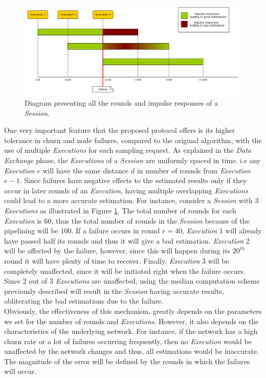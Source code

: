 \documentclass[a4paper,11pt,twoside]{report}
\begin{document}
\begin{figure}[h]
\centering
\includegraphics[width=1\textwidth]{../figures/fault_tolerance.png}
\caption{Diagram presenting all the rounds and impulse responses of a \textit{Session}.}
\label{fig:fault_tolerance}
\end{figure}
One very important feature that the proposed protocol offers is its higher tolerance in churn and node failures, compared to the original algorithm, with the use of multiple \textit{Executions} for each sampling request. As explained in the \textit{Data Exchange} phase, the \textit{Executions} of a \textit{Session} are uniformly spaced in time. i.e any \textit{Execution} $e$ will have the same distance $d$ in number of rounds from \textit{Execution} $e-1$. Since failures have negative effects to the estimated results only if they occur in later rounds of an \textit{Execution}, having multiple overlapping \textit{Executions} could lead to a more accurate estimation. For instance, consider a \textit{Session} with 3 \textit{Executions} as illustrated in Figure \ref{fig:fault_tolerance}. The total number of rounds for each \textit{Execution} is 60, thus the total number of rounds in the \textit{Session} because of the pipelining will be 100. If a failure occurs in round $r=40$, \textit{Execution} 1 will already have passed half its rounds and thus it will give a bad estimation. \textit{Execution} 2 will be affected by the failure, however, since this will happen during its $20^{th}$ round it will have plenty of time to recover. Finally, \textit{Execution} 3 will be completely unaffected, since it will be initiated right when the failure occurs. Since 2 out of 3 \textit{Executions} are unaffected, using the median computation scheme previously described will result in the \textit{Session} having accurate results, obliterating the bad estimations due to the failure. \\


Obviously, the effectiveness of this mechanism, greatly depends on the parameters we set for the number of rounds and \textit{Executions}. However, it also depends on the characteristics of the underlying network. For instance, if the network has a high churn rate or a lot of failures occurring frequently, then no \textit{Execution} would be unaffected by the network changes and thus, all estimations would be inaccurate. The magnitude of the error will be defined by the rounds in which the failures will occur.   
\end{document}
